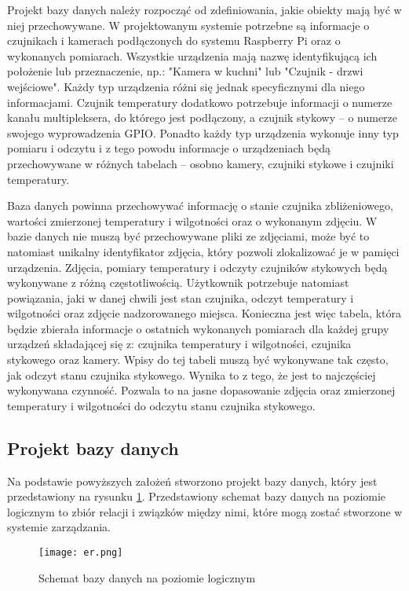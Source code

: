 \documentclass[a4paper,11pt,twoside]{article}
\begin{document}
Projekt bazy danych należy rozpocząć od zdefiniowania, jakie obiekty mają być w niej przechowywane. W projektowanym systemie potrzebne są informacje o czujnikach i kamerach podłączonych do systemu Raspberry Pi oraz o wykonanych pomiarach. Wszystkie urządzenia mają nazwę identyfikującą ich położenie lub przeznaczenie, np.: "Kamera w kuchni" lub "Czujnik - drzwi wejściowe". Każdy typ urządzenia różni się jednak specyficznymi dla niego informacjami. Czujnik temperatury dodatkowo potrzebuje informacji o numerze kanału multipleksera, do którego jest podłączony, a czujnik stykowy -- o numerze swojego wyprowadzenia GPIO. Ponadto każdy typ urządzenia wykonuje inny typ pomiaru i odczytu i z tego powodu informacje o urządzeniach będą przechowywane w różnych tabelach -- osobno kamery, czujniki stykowe i czujniki temperatury.

Baza danych powinna przechowywać informację o stanie czujnika zbliżeniowego, wartości zmierzonej temperatury i wilgotności oraz o wykonanym zdjęciu. W bazie danych nie muszą być przechowywane pliki ze zdjęciami, może być to natomiast unikalny identyfikator zdjęcia, który pozwoli zlokalizować je w pamięci urządzenia. Zdjęcia, pomiary temperatury i odczyty czujników stykowych będą wykonywane z różną częstotliwością. Użytkownik potrzebuje natomiast powiązania, jaki w danej chwili jest stan czujnika, odczyt temperatury i wilgotności oraz zdjęcie nadzorowanego miejsca. Konieczna jest więc tabela, która będzie zbierała informacje o ostatnich wykonanych pomiarach dla każdej grupy urządzeń składającej się z: czujnika temperatury i wilgotności, czujnika stykowego oraz kamery. Wpisy do tej tabeli muszą być wykonywane tak często, jak odczyt stanu czujnika stykowego. Wynika to z tego, że jest to najczęściej wykonywana czynność. Pozwala to na jasne dopasowanie zdjęcia oraz zmierzonej temperatury i wilgotności do odczytu stanu czujnika stykowego.

\subsection{Projekt bazy danych}

Na podstawie powyższych założeń stworzono projekt bazy danych, który jest przedstawiony na rysunku \ref{fig: er}. Przedstawiony schemat bazy danych na poziomie logicznym to zbiór relacji i związków między nimi, które mogą zostać stworzone w systemie zarządzania. 

\begin{figure}[h]
\texttt{[image: er.png]}
\caption{Schemat bazy danych na poziomie logicznym}
\label{fig: er}
\end{figure}
\end{document}
